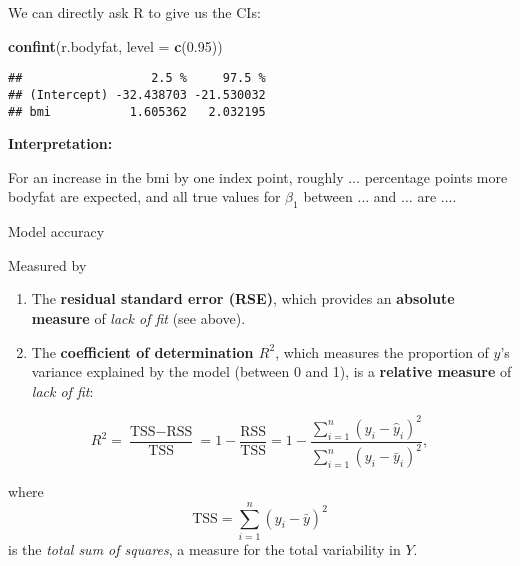 \documentclass[10pt,ignorenonframetext,]{beamer}
\newenvironment{Shaded}{\begin{snugshade}}{\end{snugshade}}
\newcommand{\DataTypeTok}[1]{\textcolor[rgb]{0.13,0.29,0.53}{#1}}
\newcommand{\FloatTok}[1]{\textcolor[rgb]{0.00,0.00,0.81}{#1}}
\newcommand{\KeywordTok}[1]{\textcolor[rgb]{0.13,0.29,0.53}{\textbf{#1}}}
\newcommand{\NormalTok}[1]{#1}
\providecommand{\tightlist}{%
  \setlength{\itemsep}{0pt}\setlength{\parskip}{0pt}}
\begin{document}
\begin{frame}[fragile]

We can directly ask R to give us the CIs:

\vspace{4mm}

\scriptsize

\begin{Shaded}
\begin{Highlighting}[]
\KeywordTok{confint}\NormalTok{(r.bodyfat, }\DataTypeTok{level =} \KeywordTok{c}\NormalTok{(}\FloatTok{0.95}\NormalTok{))}
\end{Highlighting}
\end{Shaded}

\begin{verbatim}
##                  2.5 %     97.5 %
## (Intercept) -32.438703 -21.530032
## bmi           1.605362   2.032195
\end{verbatim}

\vspace{4mm}

\normalsize

\textbf{Interpretation:}

For an increase in the bmi by one index point, roughly \(\ldots\)
percentage points more bodyfat are expected, and all true values for
\(\beta_1\) between \(\ldots\) and \(\ldots\) are \(\ldots\).

\end{frame}

\begin{frame}{Model accuracy}
\protect\hypertarget{model-accuracy}{}

Measured by

\begin{enumerate}
\tightlist
\item
  The \textbf{residual standard error (RSE)}, which provides an
  \textbf{absolute measure} of \emph{lack of fit} (see above).
\end{enumerate}

\vspace{2mm}

\begin{enumerate}
\setcounter{enumi}{1}
\tightlist
\item
  The \textbf{coefficient of determination \(R^2\)}, which measures the
  proportion of \(y\)'s variance explained by the model (between 0 and
  1), is a \textbf{relative measure} of \emph{lack of fit}:
\end{enumerate}

\[R^2 = \frac{\text{TSS}-\text{RSS}}{\text{TSS}}= 1-\frac{\text{RSS}}{\text{TSS}}=1-\frac{\sum_{i=1}^n(y_i-\hat{y}_i)^2}{\sum_{i=1}^n(y_i-\bar{y}_i)^2}, \]

where \[\text{TSS} = \sum_{i=1}^n (y_i - \bar{y})^2\] is the \emph{total
sum of squares}, a measure for the total variability in \(Y\).

\end{frame}
\end{document}
